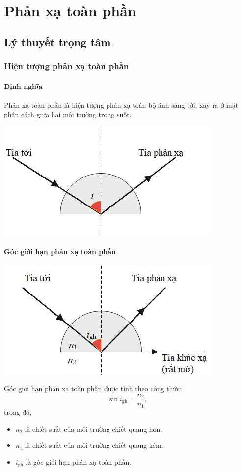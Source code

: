 \chapter{Phản xạ toàn phần}
\section{Lý thuyết trọng tâm}
\subsection{Hiện tượng phản xạ toàn phần}
\subsubsection{Định nghĩa}
Phản xạ toàn phần là hiện tượng phản xạ toàn bộ ánh sáng tới, xảy ra ở mặt phân cách giữa hai môi trường trong suốt.
\begin{center}
	\includegraphics[scale=0.8]{../figs/VN11-PH-35-L-024-1-h60.jpg}
\end{center}
\subsubsection{Góc giới hạn phản xạ toàn phần}
\begin{center}
	\includegraphics[scale=0.8]{../figs/VN11-PH-35-L-024-1-h59.jpg}
\end{center}
Góc giới hạn phản xạ toàn phần được tính theo công thức:
\begin{equation}
\sin i_{\text{gh}}=\dfrac{n_2}{n_1},
\end{equation}
trong đó,
\begin{itemize}
	\item $n_2$ là chiết suất của môi trường chiết quang hơn.
	\item $n_1$ là chiết suất của môi trường chiết quang kém.
	\item $ i_{\text{gh}}$ là góc giới hạn phản xạ toàn phần.
\end{itemize}
